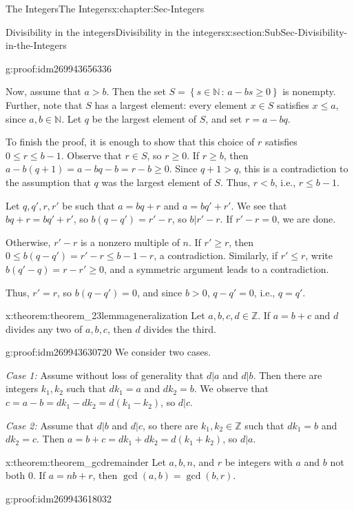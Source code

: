 \documentclass[oneside,10pt,]{book}
\numberwithin{equation}{section}
\renewcommand{\le}{\leqslant}
\renewcommand{\ge}{\geqslant}
\newcommand{\setof}[2]{{\left\{#1\,\colon\,#2\right\}}}
\def\Z{{\mathbb Z}}
\def\N{{\mathbb N}}
\newcommand{\lt}{<}
\begin{document}
\begin{chapterptx}{The Integers}{}{The Integers}{}{}{x:chapter:Sec-Integers}
\begin{sectionptx}{Divisibility in the integers}{}{Divisibility in the integers}{}{}{x:section:SubSec-Divisibility-in-the-Integers}
\begin{proofptx}{}{g:proof:idm269943656336}
\par
Now, assume that \(a > b\). Then the set \(S = \setof{s\in\N}{a-bs \ge 0}\) is nonempty. Further, note that \(S\) has a largest element: every element \(x\in S\) satisfies \(x \le a\), since \(a,b\in\N\). Let \(q\) be the largest element of \(S\), and set \(r = a - bq\).%
\par
To finish the proof, it is enough to show that this choice of \(r\) satisfies \(0\le r \le b-1\). Observe that \(r\in S\), so \(r\ge 0\). If \(r \ge b\), then \(a - b(q+1) = a-bq -b = r -b \ge 0\). Since \(q+1 > q\), this is a contradiction to the assumption that \(q\) was the largest element of \(S\). Thus, \(r \lt b\), i.e., \(r \le b-1\).%
\par
Let \(q,q',r,r'\) be such that \(a = bq+r\) and \(a=bq'+r'\). We see that \(bq+r = bq' + r'\), so \(b(q-q') = r'-r\), so \(b|r'-r\). If \(r'-r = 0\), we are done.%
\par
Otherwise, \(r'-r\) is a nonzero multiple of \(n\). If \(r' \ge r\), then \(0\le b(q-q') = r' - r \le b-1 - r\), a contradiction. Similarly, if \(r' \le r\), write \(b(q'-q) = r-r' \ge 0\), and a symmetric argument leads to a contradiction.%
\par
Thus, \(r' = r\), so \(b(q-q') = 0\), and since \(b > 0\), \(q - q'= 0\), i.e., \(q = q'\).%
\end{proofptx}
\begin{theorem}{}{}{x:theorem:theorem_23lemmageneralization}%
Let \(a,b,c,d\in \Z\). If \(a = b+c\) and \(d\) divides any two of \(a,b,c\), then \(d\) divides the third.%
\end{theorem}
\begin{proofptx}{}{g:proof:idm269943630720}
We consider two cases.%
\par
\emph{Case 1:} Assume without loss of generality that \(d|a\) and \(d|b\). Then there are integers \(k_1, k_2\) such that \(d k_1 = a\) and \(d k_2 = b\). We observe that \(c = a - b = d k_1 - d k_2 = d(k_1 - k_2)\), so \(d|c\).%
\par
\emph{Case 2:} Assume that \(d| b\) and \(d|c\), so there are \(k_1,k_2\in \Z\) such that \(d k_1 = b\) and \(d k_2 = c\). Then \(a = b+ c = dk_1 + dk_2 = d(k_1 + k_2)\), so \(d|a\).%
\end{proofptx}
\begin{theorem}{}{}{x:theorem:theorem_gcdremainder}%
Let \(a,b,n\), and \(r\) be integers with \(a\) and \(b\) not both 0. If \(a = n b + r\), then \(\gcd(a,b) = \gcd(b,r)\).%
\end{theorem}
\begin{proofptx}{}{g:proof:idm269943618032}

\end{proofptx}
\end{sectionptx}
\end{chapterptx}
\end{document}
